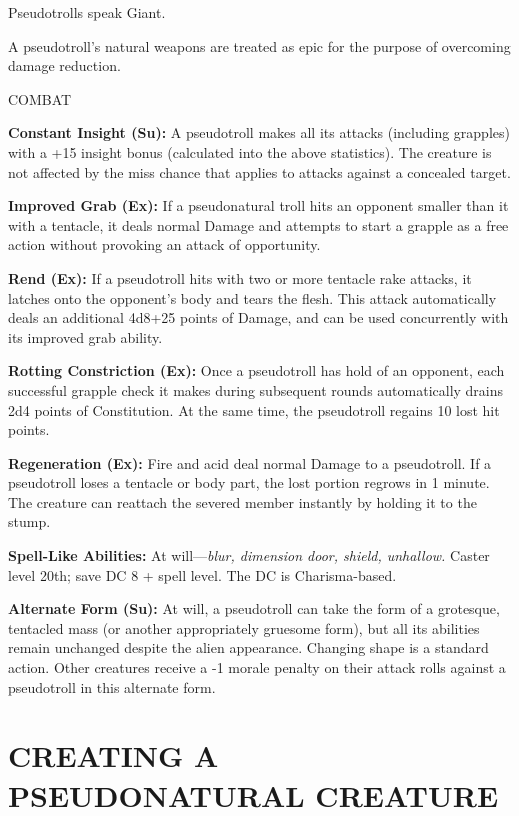 \documentclass{article}
\begin{document}
{Pseudotrolls speak Giant. 

A pseudotroll's natural weapons are treated as epic for the purpose of overcoming 
damage reduction.

COMBAT 

\textbf{Constant Insight (Su):} A pseudotroll makes all its attacks (including 
grapples) with a +15 insight bonus (calculated into the above statistics). The 
creature is not affected by the miss chance that applies to attacks against a concealed 
target. 

\textbf{Improved Grab (Ex): }If a pseudonatural troll hits an opponent smaller 
than it with a tentacle, it deals normal Damage and attempts to start a grapple 
as a free action without provoking an attack of opportunity. 

\textbf{Rend (Ex): }If a pseudotroll hits with two or more tentacle rake attacks, 
it latches onto the opponent's body and tears the flesh. This attack automatically 
deals an additional 4d8+25 points of Damage, and can be used concurrently with 
its improved grab ability. 

\textbf{Rotting Constriction (Ex): }Once a pseudotroll has hold of an opponent, 
each successful grapple check it makes during subsequent rounds automatically drains 
2d4 points of Constitution. At the same time, the pseudotroll regains 10 lost hit 
points. 

\textbf{Regeneration (Ex):} Fire and acid deal normal Damage to a pseudotroll. 
If a pseudotroll loses a tentacle or body part, the lost portion regrows in 1 minute. 
The creature can reattach the severed member instantly by holding it to the stump. 

\textbf{Spell-Like Abilities: }At will---\textit{blur, dimension door, shield, 
unhallow. }Caster level 20th; save DC 8 + spell level. The DC is Charisma-based.

\textbf{Alternate Form (Su):} At will, a pseudotroll can take the form of a grotesque, 
tentacled mass (or another appropriately gruesome form), but all its abilities 
remain unchanged despite the alien appearance. Changing shape is a standard action. 
Other creatures receive a -1 morale penalty on their attack rolls against a pseudotroll 
in this alternate form. 

\vspace{12pt}
\section*{{\LARGE{}CREATING A PSEUDONATURAL CREATURE }}

}
\end{document}
